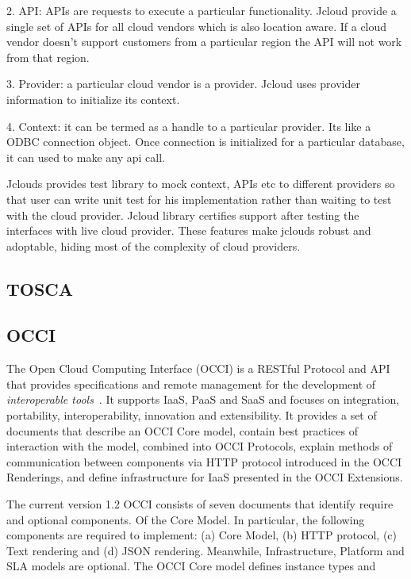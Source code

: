      2. API: APIs are requests to execute a particular
        functionality. Jcloud provide a single set of APIs for all
        cloud vendors which is also location aware. If a cloud vendor
        doesn't support customers from a particular region the API
        will not work from that region.

     3. Provider: a particular cloud vendor is a provider. Jcloud uses
        provider information to initialize its context.

     4. Context: it can be termed as a handle to a particular
        provider. Its like a ODBC connection object. Once connection
        is initialized for a particular database, it can used to make
        any api call.

        Jclouds provides test library to mock context, APIs etc to
        different providers so that user can write unit test for his
        implementation rather than waiting to test with the cloud
        provider. Jcloud library certifies support after testing the
        interfaces with live cloud provider. These features make
        jclouds robust and adoptable, hiding most of the complexity of
        cloud providers.

        \pv

\subsection{TOSCA}


\subsection{OCCI}

The Open Cloud Computing Interface (OCCI) is a RESTful Protocol and
API that provides specifications and remote management for the
development of \textit{interoperable tools}~\cite{www-occi}. It
supports IaaS, PaaS and SaaS and focuses on integration, portability,
interoperability, innovation and extensibility. It provides a set of
documents that describe an OCCI Core model, contain best practices of
interaction with the model, combined into OCCI Protocols, explain
methods of communication between components via HTTP protocol
introduced in the OCCI Renderings, and define infrastructure for IaaS
presented in the OCCI Extensions.

     The current version 1.2 OCCI consists of seven documents that
     identify require and optional components. Of the Core Model.  In
     particular, the following components are required to implement:
     (a) Core Model, (b) HTTP protocol, (c) Text rendering and (d) JSON
     rendering. Meanwhile, Infrastructure, Platform and SLA models are
     optional.  The OCCI Core model defines instance types and

